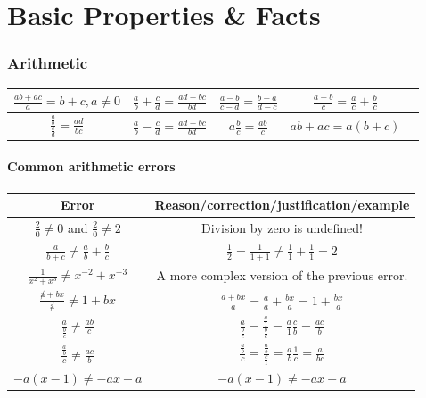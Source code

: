 \documentclass[10pt,onecolumn]{article}
\begin{document}
{\setlength{\parindent}{0pt}
\part{Basic Properties \& Facts}

\section{Arithmetic}
\begin{center}
{\renewcommand{\arraystretch}{2}
\begin{tabular}[c]{| c | c | c | c | c}
\hline
$\frac{ab + ac}{a} = b + c, a\neq 0 $ & 
$\frac{a}{b} + \frac{c}{d} = \frac{ad + bc}{bd}$ & 
$\frac{a - b}{c - d} = \frac{b - a}{d - c}$ &
$\frac{a + b}{c} = \frac{a}{c} + \frac{b}{c}$ \\
\hline
$\frac{\frac{a}{b}}{\frac{c}{d}} = \frac{ad}{bc}$ & 
$\frac{a}{b} - \frac{c}{d} = \frac{ad - bc}{bd}$ & 
$a \frac{b}{c} = \frac{ab}{c}$ &
$ab + ac = a(b+c) $ \\
\hline
\end{tabular}}
\end{center}

\subsection{Common arithmetic errors}

\begin{center}
{\renewcommand{\arraystretch}{2}
\begin{tabular}{| c | c | }
\hline
Error & Reason/correction/justification/example \\
\hline
$\frac{2}{0} \neq 0 $ and $\frac{2}{0} \neq 2 $ & Division by zero is undefined! \\
\hline
$\frac{a}{b + c} \neq \frac{a}{b} + \frac{b}{c}$ & $\frac{1}{2} = \frac{1}{1 + 1} \neq \frac{1}{1} + \frac{1}{1} = 2$  \\
\hline
$\frac{1}{x^2 + x^3} \neq x^{-2} + x^{-3}$ & A more complex version of the previous error.  \\
\hline
$\frac{\not a + bx}{\not a} \neq 1 + bx$  & $\frac{a + bx}{a} = \frac{a}{a} + \frac{bx}{a} = 1 + \frac{bx}{a}$\\
\hline
$\frac{a}{\frac{b}{c}} \neq \frac{ab}{c}$ & $\frac{a}{\frac{b}{c}} = \frac{\frac{a}{1}}{\frac{b}{c}} = \frac{a}{1} \frac{c}{b} = \frac{ac}{b}$ \\
\hline
$\frac{\frac{a}{b}}{c} \neq \frac{ac}{b}$ & $\frac{\frac{a}{b}}{c} = \frac{\frac{a}{b}}{\frac{c}{1}} = \frac{a}{b} \frac{1}{c} = \frac{a}{bc}$ \\
\hline
$-a(x-1) \neq -ax - a$ & $-a(x-1) \neq -ax + a$  \\
\hline



\end{tabular}}
\end{center}}
\end{document}
